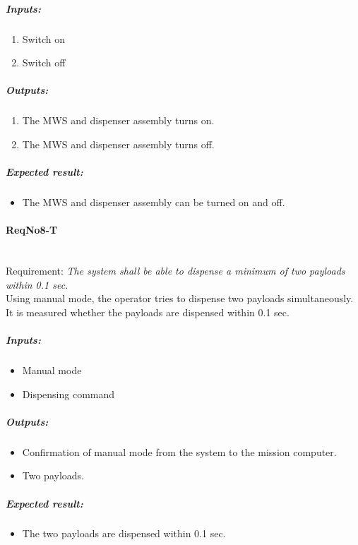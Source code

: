 \subparagraph{Inputs:}
	\begin{enumerate}
	\item Switch on
	\item Switch off
	\end{enumerate}
	\subparagraph{Outputs:}
	\begin{enumerate}
	\item The MWS and dispenser assembly turns on.
	\item The MWS and dispenser assembly turns off.
	\end{enumerate}
	\subparagraph{Expected result:}
	\begin{itemize}
	\item The MWS and dispenser assembly can be turned on and off.
	\end{itemize}


\paragraph{ReqNo8-T}\mbox{}\\ %
Requirement: \textit{The system shall be able to dispense a minimum of two payloads within 0.1 sec.}
\\
Using manual mode, the operator tries to dispense two payloads simultaneously. It is measured whether the payloads are dispensed within 0.1 sec.
\\
	\subparagraph{Inputs:}
	\begin{itemize}
	\item Manual mode
	\item Dispensing command
	\end{itemize}
	\subparagraph{Outputs:}
	\begin{itemize}
	\item Confirmation of manual mode from the system to the mission computer.
	\item Two payloads.
	\end{itemize}
	\subparagraph{Expected result:}
	\begin{itemize}
	\item The two payloads are dispensed within 0.1 sec.
	\end{itemize}

